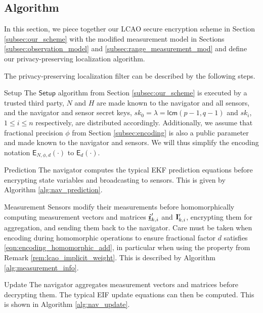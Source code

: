 \documentclass[10pt,letterpaper,oneside,twocolumn,journal]{IEEEtran}
\theoremstyle{definition}
\theoremstyle{definition}
\theoremstyle{remark}
\begin{document}
\subsection{Algorithm} \label{subsec:algorithm}
In this section, we piece together our LCAO secure encryption scheme in Section \ref{subsec:our_scheme} with the modified measurement model in Sections \ref{subsec:observation_model} and \ref{subsec:range_measurement_mod} and define our privacy-preserving localization algorithm.

The privacy-preserving localization filter can be described by the following steps.
\begin{LaTeXdescription}
    \item[Setup] The $\mathsf{Setup}$ algorithm from Section \ref{subsec:our_scheme} is executed by a trusted third party, $N$ and $H$ are made known to the navigator and all sensors, and the navigator and sensor secret keys, $sk_0=\lambda=\mathsf{lcm}(p-1, q-1)$ and $sk_i$, $1 \leq i \leq n$ respectively, are distributed accordingly. Additionally, we assume that fractional precision $\phi$ from Section \ref{subsec:encoding} is also a public parameter and made known to the navigator and sensors. We will thus simplify the encoding notation $\mathsf{E}_{N,\phi,d}(\cdot)$ to $\mathsf{E}_{d}(\cdot)$.

    \item[Prediction] The navigator computes the typical EKF prediction equations before encrypting state variables and broadcasting to sensors. This is given by Algorithm \ref{alg:nav_prediction}.

    \item[Measurement] Sensors modify their measurements before homomorphically computing measurement vectors and matrices ${\boldsymbol{\underline{i}}}'_{k,i}$ and ${{\mathbf{I}}}'_{k,i}$, encrypting them for aggregation, and sending them back to the navigator. Care must be taken when encoding during homomorphic operations to ensure fractional factor $d$ satisfies \eqref{eqn:encoding_homomorphic_add}, in particular when using the property from Remark \ref{rem:lcao_implicit_weight}. This is described by Algorithm \ref{alg:measurement_info}.

    \item[Update] The navigator aggregates measurement vectors and matrices before decrypting them. The typical EIF update equations can then be computed. This is shown in Algorithm \ref{alg:nav_update}.
\end{LaTeXdescription}
\end{document}
